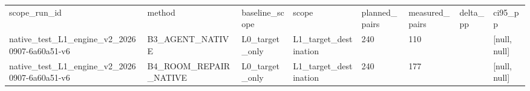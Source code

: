 \begin{tabular}{llllllll}
scope\_run\_id & method & baseline\_scope & scope & planned\_pairs & measured\_pairs & delta\_pp & ci95\_pp \\
native\_test\_L1\_engine\_v2\_20260907-6a60a51-v6 & B3\_AGENT\_NATIVE & L0\_target\_only & L1\_target\_destination & 240 & 110 &  & [null, null] \\
native\_test\_L1\_engine\_v2\_20260907-6a60a51-v6 & B4\_ROOM\_REPAIR\_NATIVE & L0\_target\_only & L1\_target\_destination & 240 & 177 &  & [null, null] \\
\end{tabular}
